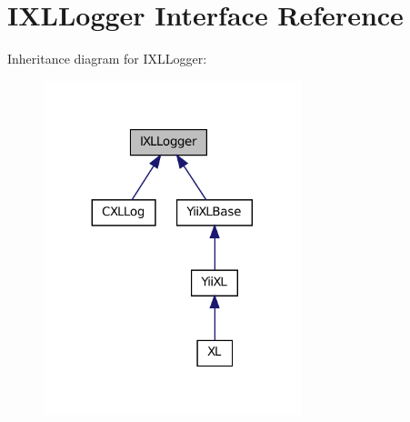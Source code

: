 \hypertarget{interfaceIXLLogger}{
\section{IXLLogger Interface Reference}
\label{interfaceIXLLogger}
}


Inheritance diagram for IXLLogger:\nopagebreak
\begin{figure}[H]
\begin{center}
\leavevmode
\includegraphics[width=212pt]{interfaceIXLLogger__inherit__graph}
\end{center}
\end{figure}
